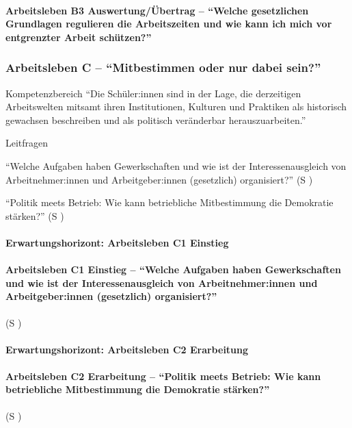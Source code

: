 \paragraph{Arbeitsleben B3 Auswertung/Übertrag -- \enquote{Welche gesetzlichen Grundlagen regulieren die Arbeitszeiten und wie kann ich mich vor entgrenzter Arbeit schützen?}}





\subsubsection{Arbeitsleben C -- \enquote{Mitbestimmen oder nur dabei sein?}}
Kompetenzbereich
\enquote{Die Schüler:innen sind in der Lage, die derzeitigen Arbeitswelten mitsamt ihren Institutionen, Kulturen und Praktiken als historisch gewachsen beschreiben und als politisch veränderbar herauszuarbeiten.}


Leitfragen
\begin{myitemize}
    \item \enquote{Welche Aufgaben haben Gewerkschaften und wie ist der Interessenausgleich von Arbeitnehmer:innen und Arbeitgeber:innen (gesetzlich) organisiert?} (\gls{S} \pageref{ARBEITSLEBEN-C1})
    \item \enquote{Politik meets Betrieb: Wie kann betriebliche Mitbestimmung die Demokratie stärken?} (\gls{S} \pageref{ARBEITSLEBEN-C2})
\end{myitemize}

\paragraph{Erwartungshorizont: Arbeitsleben C1 Einstieg}

\paragraph{Arbeitsleben C1 Einstieg -- \enquote{Welche Aufgaben haben Gewerkschaften und wie ist der Interessenausgleich von Arbeitnehmer:innen und Arbeitgeber:innen (gesetzlich) organisiert?}} (\gls{S} \pageref{ARBEITSLEBEN-C1})



\paragraph{Erwartungshorizont: Arbeitsleben C2 Erarbeitung}

\paragraph{Arbeitsleben C2 Erarbeitung -- \enquote{Politik meets Betrieb: Wie kann betriebliche Mitbestimmung die Demokratie stärken?}} (\gls{S} \pageref{ARBEITSLEBEN-C2})








